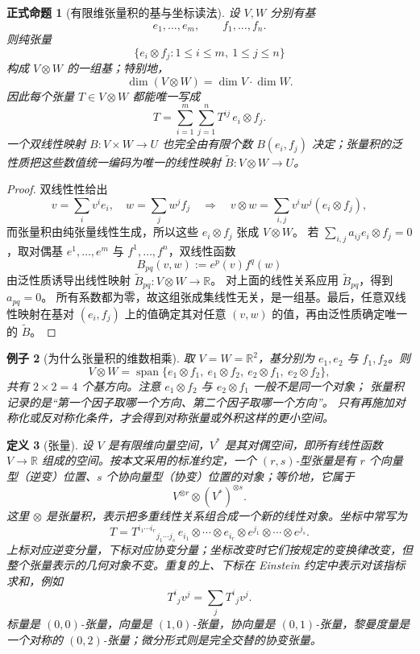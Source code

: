 \documentclass[UTF8,fontset=none,a4paper,11pt]{ctexart}
\theoremstyle{foundation-definition}
\newtheorem{definition}{定义}[section]
\theoremstyle{foundation-theorem}
\theoremstyle{foundation-proposition}
\newtheorem{proposition}[definition]{正式命题}
\theoremstyle{foundation-example}
\newtheorem{example}[definition]{例子}
\theoremstyle{foundation-remark}
\theoremstyle{foundation-theorem}
\begin{document}
\begin{proposition}[有限维张量积的基与坐标读法]\label{prop:tensor-product-basis}
设 \(V,W\) 分别有基
\[
e_1,\ldots,e_m,\qquad f_1,\ldots,f_n.
\]
则纯张量
\[
\{e_i\otimes f_j:1\leq i\leq m,\ 1\leq j\leq n\}
\]
构成 \(V\otimes W\) 的一组基；特别地，
\[
\dim(V\otimes W)=\dim V\cdot\dim W.
\]
因此每个张量 \(T\in V\otimes W\) 都能唯一写成
\[
T=\sum_{i=1}^{m}\sum_{j=1}^{n}T^{ij}\,e_i\otimes f_j.
\]
一个双线性映射 \(B:V\times W\to U\) 也完全由有限个数
\(B(e_i,f_j)\) 决定；张量积的泛性质把这些数值统一编码为唯一的线性映射
\(\widetilde B:V\otimes W\to U\)。
\end{proposition}

\begin{proof}
双线性性给出
\[
v=\sum_i v^ie_i,\quad w=\sum_j w^jf_j
\quad\Longrightarrow\quad
v\otimes w=\sum_{i,j}v^iw^j(e_i\otimes f_j),
\]
而张量积由纯张量线性生成，所以这些 \(e_i\otimes f_j\) 张成 \(V\otimes W\)。
若
\(\sum_{i,j}a_{ij}e_i\otimes f_j=0\)，取对偶基
\(e^1,\ldots,e^m\) 与 \(f^1,\ldots,f^n\)，双线性函数
\[
B_{pq}(v,w):=e^p(v)f^q(w)
\]
由泛性质诱导出线性映射 \(\widetilde B_{pq}:V\otimes W\to\mathbb R\)。
对上面的线性关系应用 \(\widetilde B_{pq}\)，得到 \(a_{pq}=0\)。
所有系数都为零，故这组张成集线性无关，是一组基。最后，任意双线性映射在基对
\((e_i,f_j)\) 上的值确定其对任意 \((v,w)\) 的值，再由泛性质确定唯一的
\(\widetilde B\)。
\end{proof}

\begin{example}[为什么张量积的维数相乘]
取 \(V=W=\mathbb R^2\)，基分别为 \(e_1,e_2\) 与 \(f_1,f_2\)。则
\[
V\otimes W
=\operatorname{span}\{e_1\otimes f_1,\ e_1\otimes f_2,\ 
e_2\otimes f_1,\ e_2\otimes f_2\},
\]
共有 \(2\times2=4\) 个基方向。注意
\(e_1\otimes f_2\) 与 \(e_2\otimes f_1\) 一般不是同一个对象；
张量积记录的是“第一个因子取哪一个方向、第二个因子取哪一个方向”。
只有再施加对称化或反对称化条件，才会得到对称张量或外积这样的更小空间。
\end{example}

\begin{definition}[张量]\label{def:tensor}
设 \(V\) 是有限维向量空间，\(V^*\) 是其对偶空间，即所有线性函数 \(V\to\mathbb R\) 组成的空间。按本文采用的标准约定，一个 \((r,s)\)-型张量是有 \(r\) 个向量型（逆变）位置、\(s\) 个协向量型（协变）位置的对象；等价地，它属于
\[
V^{\otimes r}\otimes (V^*)^{\otimes s}.
\]
这里 \(\otimes\) 是张量积，表示把多重线性关系组合成一个新的线性对象。坐标中常写为
\[
T=T^{i_1\cdots i_r}{}_{j_1\cdots j_s}
\,e_{i_1}\otimes\cdots\otimes e_{i_r}
\otimes e^{j_1}\otimes\cdots\otimes e^{j_s}.
\]
上标对应逆变分量，下标对应协变分量；坐标改变时它们按规定的变换律改变，但整个张量表示的几何对象不变。重复的上、下标在 Einstein 约定中表示对该指标求和，例如
\[
T^i{}_jv^j=\sum_jT^i{}_jv^j.
\]
标量是 \((0,0)\)-张量，向量是 \((1,0)\)-张量，协向量是 \((0,1)\)-张量，黎曼度量是一个对称的 \((0,2)\)-张量；微分形式则是完全交替的协变张量。
\end{definition}
\end{document}
